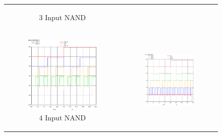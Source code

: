 \documentclass[conference]{IEEEtran}
\begin{document}
\begin{figure}[H]
\begin{tabular}{cc}
\begin{subfigure}{0.44\linewidth}
            \caption{3 Input NAND}
        \end{subfigure} \\
        \begin{subfigure}{0.44\linewidth}
            \centering
            \includegraphics[width=\textwidth]{images/nand_4_cmos_post_tran.eps}
            \caption{4 Input NAND}
        \end{subfigure} &
        \begin{subfigure}{0.44\linewidth}
            \centering
            \includegraphics[width=\textwidth]{images/nand_5_cmos_post_tran.eps}

\end{subfigure}
\end{tabular}
\end{figure}
\end{document}
